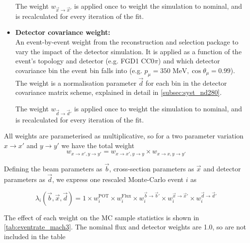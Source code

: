 \begin{itemize}
	The weight $w_{\vec{x}\rightarrow \vec{x}'}$ is applied once to weight the simulation to nominal, and is recalculated for every iteration of the fit.
	
	\item \textbf{Detector covariance weight:} \\
	An event-by-event weight from the reconstruction and selection package to vary the impact of the detector simulation. It is applied as a function of the event's topology and detector (e.g. FGD1 CC0$\pi$) and which detector covariance bin the event bin falls into (e.g. $p_\mu=350\text{ MeV}, \cos\theta_\mu=0.99$). The weight is a normalisation parameter $\vec{d}$ for each bin in the detector covariance matrix scheme, explained in detail in \autoref{subsec:syst_nd280}.
	
	The weight $w_{\vec{d}\rightarrow \vec{d}'}$ is applied once to weight the simulation to nominal, and is recalculated for every iteration of the fit.
	
\end{itemize}

All weights are parameterised as multiplicative, so for a two parameter variation $x \rightarrow x'$ and $y \rightarrow y'$ we have the total weight 
\begin{equation}
w_{x \rightarrow x', y \rightarrow y'} = w_{x \rightarrow x', y \rightarrow y} \times w_{x \rightarrow x, y\rightarrow y'}
\end{equation}

Defining the beam parameters as $\vec{b}$, cross-section parameters as $\vec{x}$ and detector parameters as $\vec{d}$, we express one rescaled Monte-Carlo event $i$ as

\begin{equation}
\lambda_i\left(\vec{b}, \vec{x}, \vec{d}\right) = 1 \times w_i^\text{POT} \times w_i^\text{Flux} \times w^{\vec{b}\rightarrow \vec{b}'}_i \times w^{\vec{x} \rightarrow \vec{x}'}_i \times w^{\vec{d}\rightarrow \vec{d}'}_i
\label{eq:mc_scale}
\end{equation}

The effect of each weight on the MC sample statistics is shown in \autoref{tab:eventrate_mach3}. The nominal flux and detector weights are 1.0, so are not included in the table


